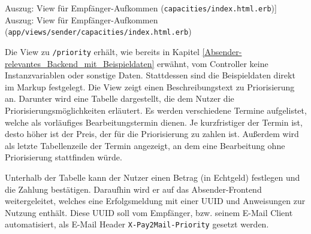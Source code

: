 \begin{listing}[!ht]
\inputminted[firstline=43, lastline=55, linenos]{erb}{Listings/capacities_index.html.erb}

\caption
    [Auszug: View für Empfänger-Aufkommen (\texttt{capacities/index.html.erb})]
    {Auszug: View für Empfänger-Aufkommen (\texttt{app/views/sender/capacities/index.html.erb})}

\label{lst:capacities/index}
\end{listing}

\noindent Die View zu \texttt{/priority} erhält, wie bereits in Kapitel \ref{Absender-relevantes_Backend_mit_Beispieldaten} erwähnt, vom Controller keine Instanzvariablen oder sonstige Daten. Stattdessen sind die Beispieldaten direkt im Markup festgelegt. Die View zeigt einen Beschreibungstext zu Priorisierung an. Darunter wird eine Tabelle dargestellt, die dem Nutzer die Priorisierungsmöglichkeiten erläutert. Es werden verschiedene Termine aufgelistet, welche als vorläufiges Bearbeitungstermin dienen. Je kurzfristiger der Termin ist, desto höher ist der Preis, der für die Priorisierung zu zahlen ist. Außerdem wird als letzte Tabellenzeile der Termin angezeigt, an dem eine Bearbeitung ohne Priorisierung stattfinden würde.

Unterhalb der Tabelle kann der Nutzer einen Betrag (in Echtgeld) festlegen und die Zahlung bestätigen. Daraufhin wird er auf das Absender-Frontend weitergeleitet, welches eine Erfolgsmeldung mit einer UUID und Anweisungen zur Nutzung enthält. Diese UUID soll vom Empfänger, bzw. seinem E-Mail Client automatisiert, als E-Mail Header \texttt{X-Pay2Mail-Priority} gesetzt werden. 